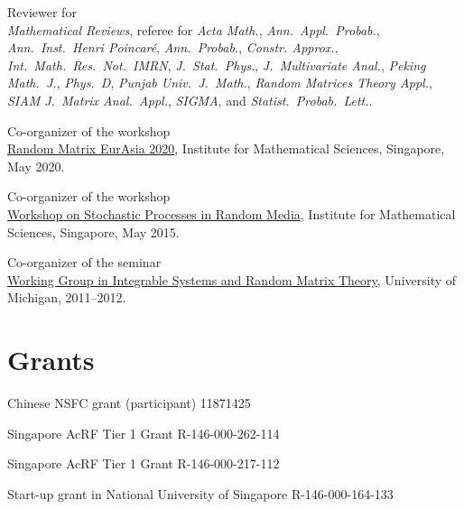 \begin{item_list}
\item Reviewer for  \\
  \textit{Mathematical Reviews}, referee for \textit{Acta Math.}, \textit{Ann.\ Appl.\ Probab.}, \textit{Ann.\ Inst.\ Henri Poincar\'{e}}, \textit{Ann.\ Probab.}, \textit{Constr. Approx.}, \textit{Int.\ Math.\ Res.\ Not.\ IMRN}, \textit{J.\ Stat.\ Phys.}, \textit{J.\ Multivariate Anal.}, \textit{Peking Math.\ J.}, \textit{Phys.\ D}, \textit{Punjab Univ.\ J.\ Math.}, \textit{Random Matrices Theory Appl.}, \textit{SIAM J.\ Matrix Anal.\ Appl.}, \textit{SIGMA}, and \textit{Statist.\ Probab.\ Lett.}.
\item Co-organizer of the workshop  \\
  \href{https://ims.nus.edu.sg/events/2020/random/index.php}{Random Matrix EurAsia 2020}, Institute for Mathematical Sciences, Singapore, May 2020.
\item Co-organizer of the workshop  \\
  \href{http://www2.ims.nus.edu.sg/Programs/015wrandom/index.php}{Workshop on Stochastic Processes in Random Media}, Institute for Mathematical Sciences, Singapore, May 2015.
\item Co-organizer of the seminar  \\
  \href{http://www.math.lsa.umich.edu/seminars_events/events.php?eventdefid=43&dt_begin=2011-07-01&dt_end=2011-12-31}
  {Working Group in Integrable Systems and Random Matrix Theory}, University of Michigan, 2011--2012.
\end{item_list}

\section*{Grants }

\begin{item_list}
\item 
  Chinese NSFC grant (participant) 
  11871425
\item
  Singapore AcRF Tier 1 Grant 
  R-146-000-262-114
\item
  Singapore AcRF Tier 1 Grant 
  R-146-000-217-112
\item
  Start-up grant in National University of Singapore 
  R-146-000-164-133
  
\end{item_list}

